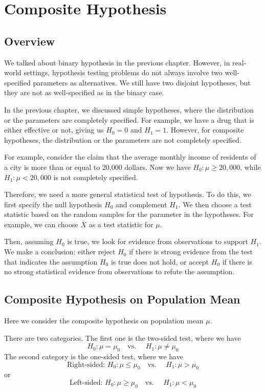 \chapter{Composite Hypothesis}

\section{Overview}
We talked about binary hypothesis in the previous chapter. However, in real-world settings, hypothesis testing problems do not always involve two well-specified parameters as alternatives. We still have two disjoint hypotheses, but they are not as well-specified as in the binary case.

In the previous chapter, we discussed simple hypotheses, where the distribution or the parameters are completely specified. For example, we have a drug that is either effective or not, giving us \(H_0 = 0\) and \(H_1 = 1\). However, for composite hypotheses, the distribution or the parameters are not completely specified.

For example, consider the claim that the average monthly income of residents of a city is more than or equal to 20,000 dollars. Now we have \(H_0: \mu \geq 20,000\), while \(H_1: \mu < 20,000\) is not completely specified.

Therefore, we need a more general statistical test of hypothesis. To do this, we first specify the null hypothesis \(H_0\) and complement \(H_1\). We then choose a test statistic based on the random samples for the parameter in the hypotheses. For example, we can choose \(\overline{X}\) as a test statistic for \(\mu\). 

Then, assuming \(H_0\) is true, we look for evidence from observations to support \(H_1\). We make a conclusion: either reject \(H_0\) if there is strong evidence from the test that indicates the assumption \(H_0\) is true does not hold, or accept \(H_0\) if there is no strong statistical evidence from observations to refute the assumption.

\section{Composite Hypothesis on Population Mean}
Here we consider the composite hypothesis on population mean \(\mu\).

There are two categories. The first one is the two-sided test, where we have
\[
  H_0: \mu = \mu_0 \quad \text{vs. } \quad H_1: \mu \neq \mu_0
\]
The second category is the one-sided test, where we have 
\[
  \text{Right-sided: } H_0: \mu \leq \mu_0 \quad \text{vs. } \quad H_1: \mu > \mu_0
\]
or
\[
  \text{Left-sided: } H_0: \mu \geq \mu_0 \quad \text{vs. } \quad H_1: \mu < \mu_0
\]

